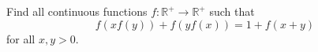 Find all continuous functions $f: \mathbb{R}^+ \to \mathbb{R}^+$ such that
\[
f(xf(y)) + f(yf(x)) = 1 + f(x+y)
\]
for all $x,y > 0$.